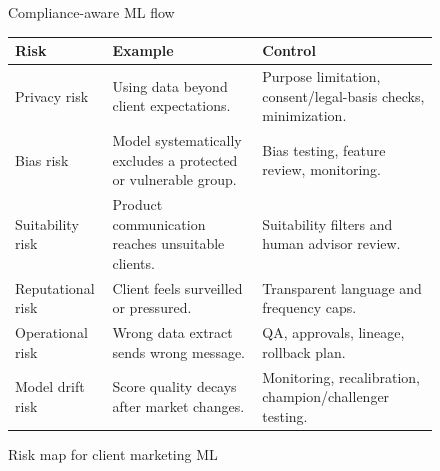 \documentclass[
	11pt,
	fleqn,
	a4paper,
	oneside,
]{LegrandOrangeBook}
\begin{document}
\begin{figure}[H]
	\centering
	\caption{Compliance-aware ML flow}
\end{figure}

\begin{figure}[H]
	\centering
	\begin{tabularx}{\textwidth}{L{0.23\textwidth} Y Y}
		\toprule
		\textbf{Risk} & \textbf{Example} & \textbf{Control}\\
		\midrule
		Privacy risk & Using data beyond client expectations. & Purpose limitation, consent/legal-basis checks, minimization.\\
		Bias risk & Model systematically excludes a protected or vulnerable group. & Bias testing, feature review, monitoring.\\
		Suitability risk & Product communication reaches unsuitable clients. & Suitability filters and human advisor review.\\
		Reputational risk & Client feels surveilled or pressured. & Transparent language and frequency caps.\\
		Operational risk & Wrong data extract sends wrong message. & QA, approvals, lineage, rollback plan.\\
		Model drift risk & Score quality decays after market changes. & Monitoring, recalibration, champion/challenger testing.\\
		\bottomrule
	\end{tabularx}
	\caption{Risk map for client marketing ML}
\end{figure}

\end{document}
